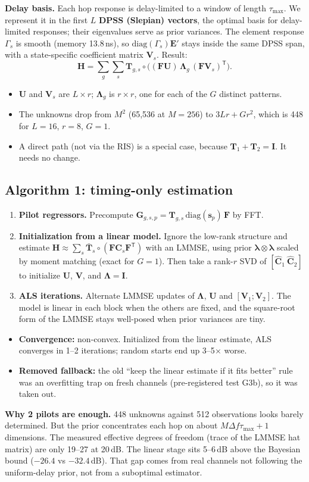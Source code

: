 \documentclass[11pt,a4paper]{article}
\newcommand{\T}{\mathsf T}
\begin{document}
\textbf{Delay basis.} Each hop response is delay-limited to a window of length $\tau_{\max}$. We represent it in the first
$L$ \textbf{DPSS (Slepian) vectors}, the optimal basis for delay-limited responses; their eigenvalues serve as prior
variances. The element response $\Gamma_s$ is smooth (memory 13.8\,ns), so $\mathrm{diag}(\Gamma_s)\bm E'$ stays inside the
same DPSS span, with a state-specific coefficient matrix $\bm V_s$. Result:
\[ \bm H = \sum_g\sum_s \bm T_{g,s}\circ\big((\bm F\bm U)\,\bm\Lambda_g\,(\bm F\bm V_s)^{\T}\big). \]
\begin{itemize}
\item $\bm U$ and $\bm V_s$ are $L\times r$; $\bm\Lambda_g$ is $r\times r$, one for each of the $G$ distinct patterns.
\item The unknowns drop from $M^2$ (65{,}536 at $M=256$) to \textbf{$3Lr+Gr^2$}, which is 448 for $L=16$, $r=8$, $G=1$.
\item A direct path (not via the RIS) is a special case, because $\bm T_1+\bm T_2=\bm I$. It needs no change.
\end{itemize}

\subsection{Algorithm 1: timing-only estimation}
\begin{enumerate}
\item \textbf{Pilot regressors.} Precompute $\bm G_{g,s,p}=\bm T_{g,s}\,\mathrm{diag}(\bm s_p)\,\bm F$ by FFT.
\item \textbf{Initialization from a linear model.} Ignore the low-rank structure and estimate
$\bm H\approx\sum_s\bar{\bm T}_s\circ(\bm F\bm C_s\bm F^{\T})$ with an LMMSE, using prior $\bm\lambda\otimes\bm\lambda$ scaled
by moment matching (exact for $G=1$). Then take a rank-$r$ SVD of $[\hat{\bm C}_1\ \hat{\bm C}_2]$ to initialize $\bm U$,
$\bm V$, and $\bm\Lambda=\bm I$.
\item \textbf{ALS iterations.} Alternate LMMSE updates of $\bm\Lambda$, $\bm U$ and $[\bm V_1;\bm V_2]$. The model is linear
in each block when the others are fixed, and the square-root form of the LMMSE stays well-posed when prior variances are
tiny.
\end{enumerate}
\begin{itemize}
\item \textbf{Convergence:} non-convex. Initialized from the linear estimate, ALS converges in 1--2 iterations; random
starts end up 3--5$\times$ worse.
\item \textbf{Removed fallback:} the old ``keep the linear estimate if it fits better'' rule was an overfitting trap on
fresh channels (pre-registered test G3b), so it was taken out.
\end{itemize}
\textbf{Why 2 pilots are enough.} 448 unknowns against 512 observations looks barely determined. But the prior concentrates
each hop on about $M\Delta f\tau_{\max}+1$ dimensions. The measured effective degrees of freedom (trace of the LMMSE hat
matrix) are only 19--27 at 20\,dB. The linear stage sits 5--6\,dB above the Bayesian bound ($-26.4$ vs $-32.4$\,dB). That
gap comes from real channels not following the uniform-delay prior, not from a suboptimal estimator.
\end{document}
